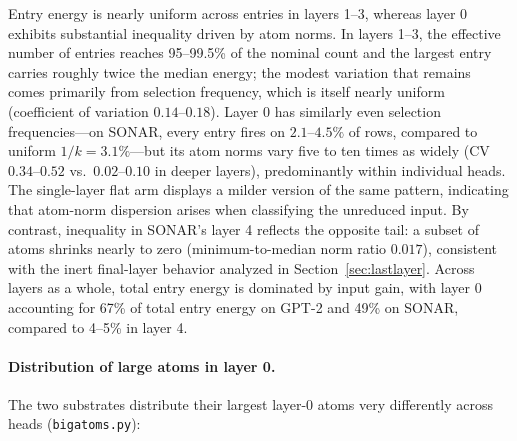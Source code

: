 Entry energy is nearly uniform across entries in layers 1--3, whereas
layer 0 exhibits substantial inequality driven by atom norms. In
layers 1--3, the effective number of entries reaches 95--99.5\% of the
nominal count and the largest entry carries roughly twice the median
energy; the modest variation that remains comes primarily from selection
frequency, which is itself nearly uniform (coefficient of variation
$0.14$--$0.18$). Layer 0 has similarly even selection frequencies---on
SONAR, every entry fires on $2.1$--$4.5\%$ of rows, compared to uniform
$1/k = 3.1\%$---but its atom norms vary five to ten times as widely (CV
$0.34$--$0.52$ vs.\ $0.02$--$0.10$ in deeper layers), predominantly within
individual heads. The single-layer flat arm displays a milder version of
the same pattern, indicating that atom-norm dispersion arises when
classifying the unreduced input. By contrast, inequality in SONAR's
layer 4 reflects the opposite tail: a subset of atoms shrinks nearly to
zero (minimum-to-median norm ratio $0.017$), consistent with the inert
final-layer behavior analyzed in Section~\ref{sec:lastlayer}. Across
layers as a whole, total entry energy is dominated by input gain, with
layer 0 accounting for 67\% of total entry energy on GPT-2 and 49\% on
SONAR, compared to 4--5\% in layer 4.

\paragraph{Distribution of large atoms in layer 0.} The two substrates
distribute their largest layer-0 atoms very differently across heads
(\texttt{bigatoms.py}):

